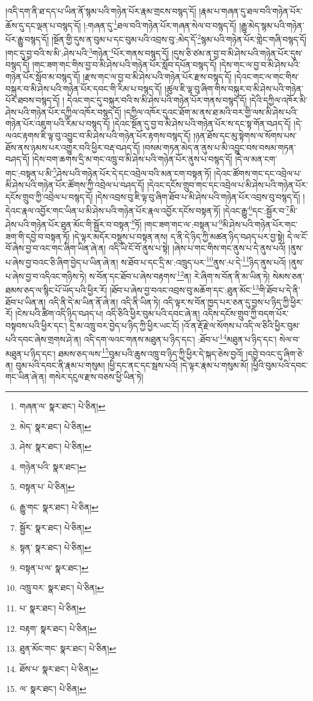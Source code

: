 །འདི་དག་ནི་ཐ་དད་པ་ཡིན་ནོ་སྙམ་པའི་གཉེན་པོར་རྣམ་གྲངས་བསྙད་དོ། །རྣམ་པ་གཞན་དུ་ཐལ་བའི་གཉེན་པོར་ཆོས་དུ་དང་ལྡན་པ་བསྙད་དོ། །:གཞན་དུ་\footnote{གཞན་ལ་  སྣར་ཐང་།  པེ་ཅིན། }ཐལ་བའི་གཉེན་པོར་གཞན་སེལ་བ་བསྙད་དོ། །རྒྱུ་མེད་སྙམ་པའི་གཉེན་པོར་རྒྱུ་བསྙད་དོ། །སྔོན་གྱི་དུས་ན་བུམ་པ་དང་བུམ་པའི་འབྲས་བུ་:མེད་དོ་\footnote{མེད་  སྣར་ཐང་།  པེ་ཅིན། }སྙམ་པའི་གཉེན་པོར་གླེང་གཞི་བསྙད་དོ། །གང་དུ་བྱ་བའི་ས་མི་:ཤེས་པའི་\footnote{ཤེས་  སྣར་ཐང་།  པེ་ཅིན། }གཉེན་\footnote{གཉེན་པའི་  སྣར་ཐང་། }པོར་གནས་བསྙད་དོ། །དུས་ཅི་ཙམ་ན་བྱ་བ་མི་ཤེས་པའི་གཉེན་པོར་དུས་བསྙད་དོ། །གང་ཟག་གང་གིས་བྱ་བ་མི་ཤེས་པའི་གཉེན་པོར་སློབ་དཔོན་བསྙད་དོ། །དེས་གང་ལ་བྱ་བ་མི་ཤེས་པའི་གཉེན་པོར་སློབ་མ་བསྙད་དོ། །རྫས་གང་ལ་བྱ་བ་མི་ཤེས་པའི་གཉེན་པོར་རྫས་བསྙད་དོ། །དེའང་གང་ལ་གང་གིས་བསྐུར་བ་མི་ཤེས་པའི་གཉེན་པོར་དབང་གི་རིམ་པ་བསྙད་དོ། །ཚུལ་ཇི་ལྟ་བུ་ཞིག་གིས་བསྐུར་བ་མི་ཤེས་པའི་གཉེན་པོར་ཐབས་བསྙད་དོ། །
དེའང་གང་དུ་བསྐུར་བའི་ས་མི་ཤེས་པའི་གཉེན་པོར་གནས་བསྙད་དོ། །དེའི་དཀྱིལ་འཁོར་མི་ཤེས་པའི་གཉེན་པོར་དཀྱིལ་འཁོར་བསྙད་དོ། །དཀྱིལ་འཁོར་དུའང་ཐོག་མ་ནས་ཐ་མའི་བར་གྱི་ལས་མི་ཤེས་པའི་གཉེན་པོར་འཇུག་པའི་རིམ་པ་བསྙད་དོ། །དེའང་སྔོན་དུ་བྱ་བ་མི་ཤེས་པའི་གཉེན་པོར་ས་དང་སྟ་གོན་བཤད་དོ། །དེ་ལའང་རྟགས་ཇི་ལྟ་བུ་འབྱུང་བ་མི་ཤེས་པའི་གཉེན་པོར་རྟགས་བསྙད་དོ། །ཉན་ཐོས་དང་མུ་སྟེགས་ལ་སོགས་པས་ཐོས་ནས་ཉམས་པར་འགྱུར་བའི་ཕྱིར་བརྡ་བཤད་དོ། །བསམ་གཏན་མེད་ན་ནུས་པ་མི་འབྱུང་བས་བསམ་གཏན་བཤད་དོ། །དེས་བག་ཆགས་དྲི་མ་གང་འཁྲུ་བ་མི་ཤེས་པའི་གཉེན་པོར་ནུས་པ་བསྙད་དོ། །དེ་ལ་མན་ངག་གང་:བསྟན་པ་མི་\footnote{བསྟན་པ་  པེ་ཅིན། }ཤེས་པའི་གཉེན་པོར་དེ་དང་འབྲེལ་བའི་མན་ངག་བསྟན་ཏོ། །དེའང་ཚོགས་གང་དང་འབྲེལ་པ་མི་ཤེས་པའི་གཉེན་པོར་ཚོགས་ཀྱི་འབྲེལ་པ་བཤད་དོ། །དེའང་དངོས་གྲུབ་གང་དང་འབྲེལ་པ་མི་ཤེས་པའི་གཉེན་པོར་དངོས་གྲུབ་ཀྱི་འབྲེལ་པ་བསྙད་དོ། །དེས་འབྲས་བུ་ཇི་ལྟ་བུ་ཞིག་ཐོབ་པ་མི་ཤེས་པའི་གཉེན་པོར་འབྲས་བུ་བསྙད་དོ། །དེའང་རྣལ་འབྱོར་གང་ཡིན་པ་མི་ཤེས་པའི་གཉེན་པོར་རྣལ་འབྱོར་དངོས་བསྟན་ཏོ། །དེའང་རྒྱུ་\footnote{རྒྱུ་གང་  སྣར་ཐང་།  པེ་ཅིན། }དང་:སྦྱོར་བ་\footnote{སྦྱོར་  སྣར་ཐང་།  པེ་ཅིན། }མི་ཤེས་པའི་གཉེན་པོར་ཐུན་མོང་གི་སྦྱོར་བ་བསྟན་\footnote{སྟན་  སྣར་ཐང་།  པེ་ཅིན། }ཏོ། །གང་ཟག་གང་ལ་:བསྟན་པ་\footnote{བསྟན་པ་ལ་  སྣར་ཐང་། }མི་ཤེས་པའི་གཉེན་པོར་གང་ཟག་གི་དབྱེ་བ་བསྟན་ཏོ། །དེ་ལྟར་མདོར་བསྡུས་པ་བསྟན་ནས། ད་ནི་དེ་ཉིད་ཀྱི་མཚན་ཉིད་བཤད་པར་བྱ་སྟེ། དེ་ལ་ངོ་བོ་ཞེས་བྱ་བ་འང་གང་ཞིག་ཡིན་ཞེ་ན། འདི་ཡི་ངོ་བོ་ནུས་པ་སྟེ། །ཞེས་པ་གང་གིས་གང་ནུས་པ་དེ་ནུས་པའོ། །ནུས་པ་ཞེས་བྱ་བའང་ཅི་ཞིག་བྱེད་པ་ཡིན་ཞེ་ན། ས་ཐོབ་པ་དང་དྲི་མ་:འཁྲུད་པར་\footnote{འཁྲུ་བར་  སྣར་ཐང་།  པེ་ཅིན། }ནུས་:པ་དེ་\footnote{པ་  སྣར་ཐང་།  པེ་ཅིན། }ཉིད་ནུས་པའོ། །ནུས་པ་ཞེས་བྱ་བ་འདིའང་གཉིས་ཏེ། ས་བོན་དང་ཐོབ་པ་ཞེས་བརྟགས་\footnote{བརྟག་  སྣར་ཐང་།  པེ་ཅིན། }ན། རེ་ཞིག་ས་བོན་ནི་མ་ཡིན་ཏེ། སེམས་ཅན་ཐམས་ཅད་ལ་སྙིང་པོ་ཡོད་པའི་ཕྱིར་རོ། །ཐོབ་པ་ཞེས་བྱ་བའང་འབྲས་བུ་མཆོག་དང་:ཐུན་མོང་\footnote{ཐུན་མོང་གང་  སྣར་ཐང་།  པེ་ཅིན། }གི་ཐོབ་པ་དེ་ནི་ཐོབ་པ་ཡིན་ན། འདི་ནི་དེ་མ་ཡིན་ནོ་ཞེ་ན། འདི་ནི་ཡིན་ཏེ། འདི་ལྟར་ས་བོན་ཁྱད་པར་ཅན་དུ་བྱས་པ་ཉིད་ཀྱི་ཕྱིར་རོ། །ངེས་པའི་ཚིག་འདི་ཉིད་བཤད་པ། འདི་ཅིའི་ཕྱིར་བུམ་པའི་དབང་ཞེ་ན། འདིས་དངོས་གྲུབ་ཀྱི་བདག་པོར་བསྟབས་པའི་ཕྱིར་དང་། དྲི་མ་འཁྲུ་བར་བྱེད་པ་ཉིད་ཀྱི་ཕྱིར་ཡང་ངོ། །འོ་ན་རྡོ་རྗེ་ལ་སོགས་པ་འདི་ལ་ཅིའི་ཕྱིར་བུམ་པའི་དབང་ཞེས་གྲགས་ཤེ་ན། འདི་དག་ལའང་གནས་མཐུན་པ་ཉིད་དང་། :ཐོབ་པ་\footnote{ཐོས་པ་  སྣར་ཐང་།  པེ་ཅིན། }མཐུན་པ་ཉིད་དང་། སེལ་བ་མཐུན་པ་ཉིད་དང་། ཐམས་ཅད་ལས་\footnote{ལ་  སྣར་ཐང་།  པེ་ཅིན། }བུམ་པའི་ཆུས་འཁྲུ་བ་ཉིད་ཀྱི་ཕྱིར་དེ་སྐད་ཅེས་བྱའོ། །དབྱེ་བའང་དུ་ཞིག་ཅེ་ན། བུམ་པའི་དབང་ནི་རྣམ་པ་གསུམ། །ཕྱི་དང་ནང་དང་སྦས་པའོ། །དེ་ལྟར་རྣམ་པ་གསུམ་མོ། །ཕྱིའི་བུམ་པའི་དབང་གང་ཡིན་ཞེ་ན། གསེར་དངུལ་རྫས་བཅས་ཕྱི་ཡིན་ཏེ། 
